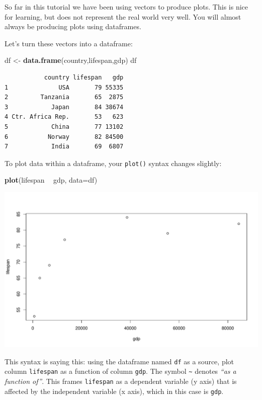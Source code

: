 \documentclass[
]{book}
\newenvironment{Shaded}{\begin{snugshade}}{\end{snugshade}}
\newcommand{\DataTypeTok}[1]{\textcolor[rgb]{0.13,0.29,0.53}{#1}}
\newcommand{\KeywordTok}[1]{\textcolor[rgb]{0.13,0.29,0.53}{\textbf{#1}}}
\newcommand{\NormalTok}[1]{#1}
\newcommand{\OperatorTok}[1]{\textcolor[rgb]{0.81,0.36,0.00}{\textbf{#1}}}
\newcommand{\StringTok}[1]{\textcolor[rgb]{0.31,0.60,0.02}{#1}}
\begin{document}
So far in this tutorial we have been using vectors to produce plots. This is nice for learning, but does not represent the real world very well. You will almost always be producing plots using dataframes.

Let's turn these vectors into a dataframe:

\begin{Shaded}
\begin{Highlighting}[]
\NormalTok{df <-}\StringTok{ }\KeywordTok{data.frame}\NormalTok{(country,lifespan,gdp)}
\NormalTok{df}
\end{Highlighting}
\end{Shaded}

\begin{verbatim}
           country lifespan   gdp
1              USA       79 55335
2         Tanzania       65  2875
3            Japan       84 38674
4 Ctr. Africa Rep.       53   623
5            China       77 13102
6           Norway       82 84500
7            India       69  6807
\end{verbatim}

To plot data within a dataframe, your \texttt{plot()} syntax changes slightly:

\begin{Shaded}
\begin{Highlighting}[]
\KeywordTok{plot}\NormalTok{(lifespan }\OperatorTok{~}\StringTok{ }\NormalTok{gdp, }\DataTypeTok{data=}\NormalTok{df)}
\end{Highlighting}
\end{Shaded}

\includegraphics{figures/unnamed-chunk-118-1.pdf}

This syntax is saying this: using the dataframe named \texttt{df} as a source, plot column \texttt{lifespan} as a function of column \texttt{gdp}. The symbol \texttt{\textasciitilde{}} denotes \emph{``as a function of''}. This frames \texttt{lifespan} as a dependent variable (y axis) that is affected by the independent variable (x axis), which in this case is \texttt{gdp}.
\end{document}
